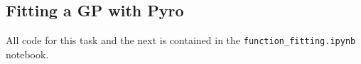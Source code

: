 \subsection{Fitting a GP with Pyro}
All code for this task and the next is contained in the \texttt{function\_fitting.ipynb} notebook.
